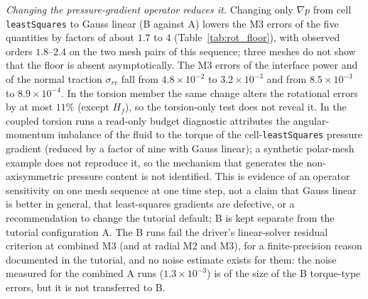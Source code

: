 \emph{Changing the pressure-gradient operator reduces it.}
Changing only $\nabla p$ from cell \texttt{leastSquares} to Gauss linear (B against A) lowers the M3 errors of the five quantities by factors of about $1.7$ to $4$ (Table~\ref{tab:rot_floor}), with observed orders $1.8$--$2.4$ on the two mesh pairs of this sequence; three meshes do not show that the floor is absent asymptotically. The M3 errors of the interface power and of the normal traction $\sigma_{rr}$ fall from $4.8\times10^{-2}$ to $3.2\times10^{-3}$ and from $8.5\times10^{-3}$ to $8.9\times10^{-4}$.
In the torsion member the same change alters the rotational errors by at most $11\%$ (except $H_f$), so the torsion-only test does not reveal it.
In the coupled torsion runs a read-only budget diagnostic attributes the angular-momentum imbalance of the fluid to the torque of the cell-\texttt{leastSquares} pressure gradient (reduced by a factor of nine with Gauss linear); a synthetic polar-mesh example does not reproduce it, so the mechanism that generates the non-axisymmetric pressure content is not identified.
This is evidence of an operator sensitivity on one mesh sequence at one time step, not a claim that Gauss linear is better in general, that least-squares gradients are defective, or a recommendation to change the tutorial default; B is kept separate from the tutorial configuration A. The B runs fail the driver's linear-solver residual criterion at combined M3 (and at radial M2 and M3), for a finite-precision reason documented in the tutorial, and no noise estimate exists for them: the noise measured for the combined A runs ($1.3\times10^{-3}$) is of the size of the B torque-type errors, but it is not transferred to B.

